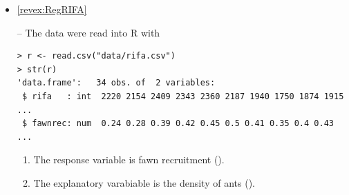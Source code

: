 \documentclass[10pt,openany]{book}\usepackage[]{graphicx}\usepackage[]{color}
\makeatletter
\newenvironment{kframe}{%
 \def\at@end@of@kframe{}%
 \ifinner\ifhmode%
  \def\at@end@of@kframe{\end{minipage}}%
  \begin{minipage}{\columnwidth}%
 \fi\fi%
 \def\FrameCommand##1{\hskip\@totalleftmargin \hskip-\fboxsep
 \colorbox{shadecolor}{##1}\hskip-\fboxsep
     \hskip-\linewidth \hskip-\@totalleftmargin \hskip\columnwidth}%
 \MakeFramed {\advance\hsize-\width
   \@totalleftmargin\z@ \linewidth\hsize
   \@setminipage}}%
 {\par\unskip\endMakeFramed%
 \at@end@of@kframe}
\newenvironment{knitrout}{}{} %
\makeatother
\begin{document}
\begin{itemize}
  \item \hypertarget{ans:RegRIFA}{\ref{revex:RegRIFA}} --   The data were read into R with
\begin{knitrout}
\color{fgcolor}\begin{kframe}
\begin{verbatim}
> r <- read.csv("data/rifa.csv")
> str(r)
'data.frame':	34 obs. of  2 variables:
 $ rifa   : int  2220 2154 2409 2343 2360 2187 1940 1750 1874 1915 ...
 $ fawnrec: num  0.24 0.28 0.39 0.42 0.45 0.5 0.41 0.35 0.4 0.43 ...
\end{verbatim}
\end{kframe}
\end{knitrout}
    \begin{enumerate}
      \item The response variable is fawn recruitment ().
      \item The explanatory varabiable is the density of ants ().


\end{enumerate}
\end{itemize}
\end{document}
